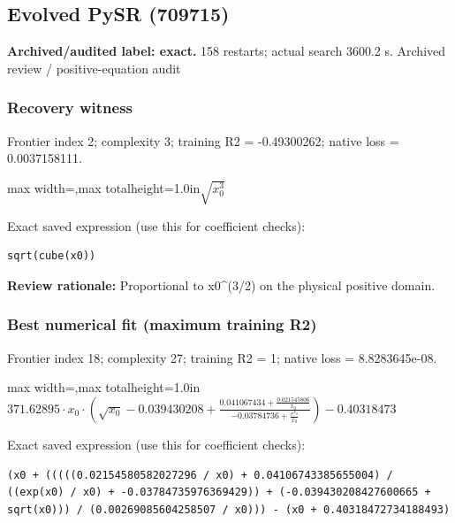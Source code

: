 \documentclass[10pt,letterpaper,landscape]{article}
\begin{document}
\begin{minipage}[t]{0.485\textwidth}
\subsection*{Evolved PySR (709715)}
\textbf{Archived/audited label: exact.} 158 restarts; actual search 3600.2 s.
{\small Archived review / positive-equation audit}
\subsubsection*{Recovery witness}
Frontier index 2; complexity 3; training R2 = -0.49300262; native loss = 0.0037158111.
\begin{center}\begin{adjustbox}{max width=\linewidth,max totalheight=1.0in}$\displaystyle \sqrt{x_{0}^{3}}$\end{adjustbox}\end{center}
{\scriptsize Exact saved expression (use this for coefficient checks):}
\begin{lstlisting}
sqrt(cube(x0))
\end{lstlisting}
{\small\textbf{Review rationale:} Proportional to x0\textasciicircum{}(3/2) on the physical positive domain.}
\subsubsection*{Best numerical fit (maximum training R2)}
Frontier index 18; complexity 27; training R2 = 1; native loss = 8.8283645e-08.
\begin{center}\begin{adjustbox}{max width=\linewidth,max totalheight=1.0in}$\displaystyle 371.62895 \cdot x_{0} \cdot \left(\sqrt{x_{0}} - 0.039430208 + \frac{0.041067434 + \frac{0.021545806}{x_{0}}}{-0.03784736 + \frac{e^{x_{0}}}{x_{0}}}\right) - 0.40318473$\end{adjustbox}\end{center}
{\scriptsize Exact saved expression (use this for coefficient checks):}
\begin{lstlisting}
(x0 + (((((0.02154580582027296 / x0) + 0.04106743385655004) / ((exp(x0) / x0) + -0.03784735976369429)) + (-0.039430208427600665 + sqrt(x0))) / (0.00269085604258507 / x0))) - (x0 + 0.40318472734188493)
\end{lstlisting}
\end{minipage}
\clearpage{}\label{kepler-10005}
\end{document}

